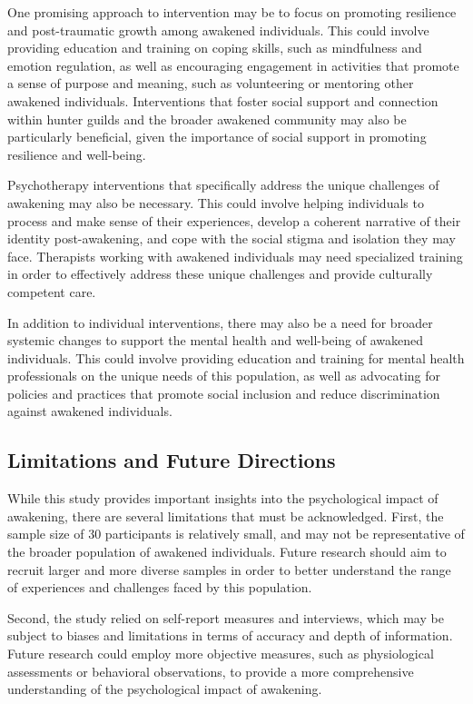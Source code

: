 \documentclass[12pt, a4paper]{article}
\begin{document}
One promising approach to intervention may be to focus on promoting resilience and post-traumatic growth among awakened individuals. This could involve providing education and training on coping skills, such as mindfulness and emotion regulation, as well as encouraging engagement in activities that promote a sense of purpose and meaning, such as volunteering or mentoring other awakened individuals. Interventions that foster social support and connection within hunter guilds and the broader awakened community may also be particularly beneficial, given the importance of social support in promoting resilience and well-being.

Psychotherapy interventions that specifically address the unique challenges of awakening may also be necessary. This could involve helping individuals to process and make sense of their experiences, develop a coherent narrative of their identity post-awakening, and cope with the social stigma and isolation they may face. Therapists working with awakened individuals may need specialized training in order to effectively address these unique challenges and provide culturally competent care.

In addition to individual interventions, there may also be a need for broader systemic changes to support the mental health and well-being of awakened individuals. This could involve providing education and training for mental health professionals on the unique needs of this population, as well as advocating for policies and practices that promote social inclusion and reduce discrimination against awakened individuals.

\subsection{Limitations and Future Directions}
While this study provides important insights into the psychological impact of awakening, there are several limitations that must be acknowledged. First, the sample size of 30 participants is relatively small, and may not be representative of the broader population of awakened individuals. Future research should aim to recruit larger and more diverse samples in order to better understand the range of experiences and challenges faced by this population.

Second, the study relied on self-report measures and interviews, which may be subject to biases and limitations in terms of accuracy and depth of information. Future research could employ more objective measures, such as physiological assessments or behavioral observations, to provide a more comprehensive understanding of the psychological impact of awakening.
\end{document}
